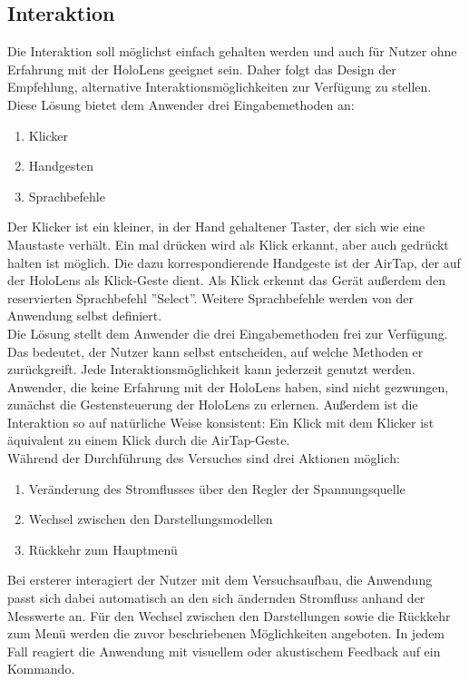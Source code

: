 \subsection{Interaktion}
\label{sec-4-4}
Die Interaktion soll möglichst einfach gehalten werden und auch für Nutzer ohne Erfahrung mit der HoloLens geeignet sein. Daher folgt das Design der Empfehlung, alternative Interaktionsmöglichkeiten zur Verfügung zu stellen. Diese Lösung bietet dem Anwender drei Eingabemethoden an:
\begin{enumerate}
	\setlength{\itemsep}{-5pt}
	\item Klicker
	\item Handgesten
	\item Sprachbefehle
\end{enumerate}

Der Klicker ist ein kleiner, in der Hand gehaltener Taster, der sich wie eine Maustaste verhält. Ein mal drücken wird als Klick erkannt, aber auch gedrückt halten ist möglich.
Die dazu korrespondierende Handgeste ist der AirTap, der auf der HoloLens als Klick-Geste dient. Als Klick erkennt das Gerät außerdem den reservierten Sprachbefehl ''Select''. Weitere Sprachbefehle werden von der Anwendung selbst definiert.\\

Die Lösung stellt dem Anwender die drei Eingabemethoden frei zur Verfügung. Das bedeutet, der Nutzer kann selbst entscheiden, auf welche Methoden er zurückgreift. Jede Interaktionsmöglichkeit kann jederzeit genutzt werden. Anwender, die keine Erfahrung mit der HoloLens haben, sind nicht gezwungen, zunächst die Gestensteuerung der HoloLens zu erlernen. Außerdem ist die Interaktion so auf natürliche Weise konsistent: Ein Klick mit dem Klicker ist äquivalent zu einem Klick durch die AirTap-Geste.\\

Während der Durchführung des Versuches sind drei Aktionen möglich:
\begin{enumerate}[topsep=-2px]
	\setlength{\itemsep}{-5pt}
	\item Veränderung des Stromflusses über den Regler der Spannungsquelle
	\item Wechsel zwischen den Darstellungsmodellen
	\item Rückkehr zum Hauptmenü
\end{enumerate}
\vspace{8px}

Bei ersterer interagiert der Nutzer mit dem Versuchsaufbau, die Anwendung passt sich dabei automatisch an den sich ändernden Stromfluss anhand der Messwerte an. Für den Wechsel zwischen den Darstellungen sowie die Rückkehr zum Menü werden die zuvor beschriebenen Möglichkeiten angeboten. In jedem Fall reagiert die Anwendung mit visuellem oder akustischem Feedback auf ein Kommando.\\

